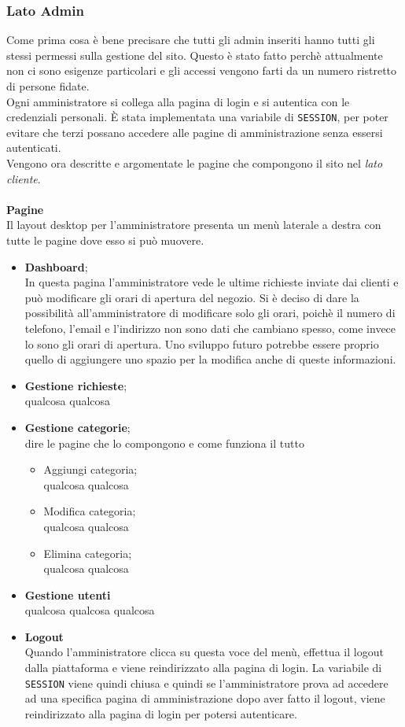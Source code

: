 \subsubsection{Lato Admin}
Come prima cosa è bene precisare che tutti gli admin inseriti hanno tutti gli stessi permessi sulla gestione del sito. Questo è stato fatto perchè attualmente non ci sono esigenze particolari e gli accessi vengono farti da un numero ristretto di persone fidate.\\
Ogni amministratore si collega alla pagina di login e si autentica con le credenziali personali. È stata implementata una variabile di \texttt{SESSION}, per poter evitare che terzi possano accedere alle pagine di amministrazione senza essersi autenticati.\\
Vengono ora descritte e argomentate le pagine che compongono il sito nel \textit{lato cliente}.\\\\
\textbf{Pagine}\\ Il layout desktop per l'amministratore presenta un menù laterale a destra con tutte le pagine dove esso si può muovere.
	\begin{itemize}
		\item \textbf{Dashboard};\\In questa pagina l'amministratore vede le ultime richieste inviate dai clienti e può modificare gli orari di apertura del negozio. Si è deciso di dare la possibilità all'amministratore di modificare solo gli orari, poichè il numero di telefono, l'email e l'indirizzo non sono dati che cambiano spesso, come invece lo sono gli orari di apertura. Uno sviluppo futuro potrebbe essere proprio quello di aggiungere uno spazio per la modifica anche di queste informazioni.
		\item \textbf{Gestione richieste};\\qualcosa qualcosa
		\item \textbf{Gestione categorie};\\dire le pagine che lo compongono e come funziona il tutto
	 	\begin{itemize}
 			\item Aggiungi categoria;\\qualcosa qualcosa
 			\item Modifica categoria;\\qualcosa qualcosa
 			\item Elimina categoria;\\qualcosa qualcosa
	 	\end{itemize}
 	\item \textbf{Gestione utenti}\\qualcosa qualcosa qualcosa
 	\item \textbf{Logout}\\Quando l'amministratore clicca su questa voce del menù, effettua il logout dalla piattaforma e viene reindirizzato alla pagina di login. La variabile di \texttt{SESSION} viene quindi chiusa e quindi se l'amministratore prova ad accedere ad una specifica pagina di amministrazione dopo aver fatto il logout, viene reindirizzato alla pagina di login per potersi autenticare.\\
 	\end{itemize}
